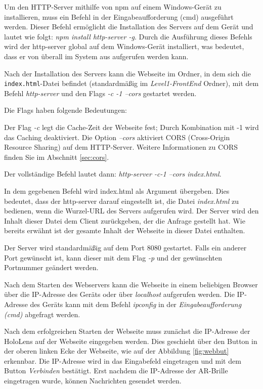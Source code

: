 Um den HTTP-Server mithilfe von npm auf einem Windows-Gerät zu installieren, muss ein Befehl in der Eingabeaufforderung (cmd) ausgeführt werden. Dieser Befehl ermöglicht die Installation des Servers auf dem Gerät und lautet wie folgt: \textit{npm install http-server -g}. Durch die Ausführung dieses Befehls wird der http-server global auf dem Windows-Gerät installiert, was bedeutet, dass er von überall im System aus aufgerufen werden kann.

Nach der Installation des Servers kann die Webseite im Ordner, in dem sich die \texttt{index.html}-Datei befindet (standardmäßig im \textit{Level1-FrontEnd} Ordner), mit dem Befehl \textit{http-server} und den Flags \textit{-c -1 --cors} gestartet werden.

Die Flags haben folgende Bedeutungen:

Der Flag \textit{-c} legt die Cache-Zeit der Webseite fest; Durch Kombination mit -1 wird das Caching deaktiviert. Die Option \textit{--cors} aktiviert CORS (Cross-Origin Resource Sharing) auf dem HTTP-Server. Weitere
Informationen zu CORS finden Sie im Abschnitt \ref{sec:cors}.

Der vollständige Befehl lautet dann: \textit{http-server -c-1 --cors index.html}.

In dem gegebenen Befehl wird index.html als Argument übergeben. Dies bedeutet, dass der http-server darauf eingestellt ist, die Datei \textit{index.html} zu bedienen, wenn die Wurzel-URL des Servers aufgerufen wird. Der Server wird den Inhalt dieser Datei dem Client zurückgeben, der die Anfrage gestellt hat. Wie bereits erwähnt ist der gesamte Inhalt der Webseite in dieser Datei enthalten.

Der Server wird standardmäßig auf dem Port 8080 gestartet. Falls ein anderer Port gewünscht ist, kann dieser mit dem Flag \textit{-p} und der gewünschten Portnummer geändert werden.

Nach dem Starten des Webservers kann die Webseite in einem beliebigen Browser über die IP-Adresse des Geräts oder über \textit{localhost} aufgerufen werden. Die IP-Adresse des Geräts kann mit dem Befehl \textit{ipconfig} in der \textit{Eingabeaufforderung (cmd)} abgefragt werden.

Nach dem erfolgreichen Starten der Webseite muss zunächst die IP-Adresse der HoloLens auf der Webseite eingegeben werden. Dies geschieht über den Button in der oberen linken Ecke der Webseite, wie auf der Abbildung \ref{fig:webbut} erkennbar. Die IP-Adresse wird in das Eingabefeld eingetragen und mit dem Button \textit{Verbinden} bestätigt. Erst nachdem die IP-Adresse der AR-Brille eingetragen wurde, können Nachrichten gesendet werden.

